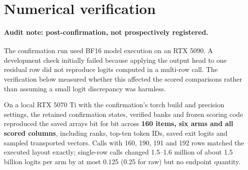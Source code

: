 \section{Numerical verification}\label{numerical-verification}

\paragraph{Audit note: post-confirmation, not prospectively registered.}

The confirmation run used BF16 model execution on an RTX 5090. A
development check initially failed because applying the output head to
one residual row did not reproduce logits computed in a multi-row call.
The verification below measured whether this affected the scored
comparisons rather than assuming a small logit discrepancy was harmless.

On a local RTX 5070 Ti with the confirmation's torch build and precision
settings, the retained confirmation states, verified banks and frozen
scoring code reproduced the saved arrays bit for bit across \textbf{160
items, six arms and all scored columns}, including ranks, top-ten token
IDs, saved exit logits and sampled transported vectors. Calls with 160,
190, 191 and 192 rows matched the executed layout exactly; single-row
calls changed 1.5--1.6 million of about 1.5 billion logits per arm by at
most 0.125 (0.25 for raw) but no endpoint quantity.


